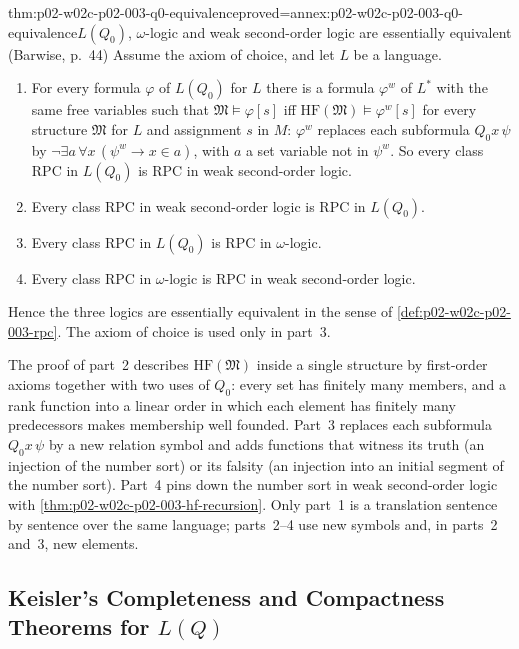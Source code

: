 \begin{hbtheorem}{thm:p02-w02c-p02-003-q0-equivalence}{proved=annex:p02-w02c-p02-003-q0-equivalence}{\(L(Q_0)\), \(\omega\)-logic and weak second-order logic are essentially equivalent (Barwise, p.~44)}
Assume the axiom of choice, and let \(L\) be a language.
\begin{enumerate}
\item For every formula \(\varphi\) of \(L(Q_0)\) for \(L\) there is a
      formula \(\varphi^{w}\) of \(L^{*}\) with the same free variables such
      that \(\mathfrak M\models\varphi[s]\) iff
      \(\mathrm{HF}(\mathfrak M)\models\varphi^{w}[s]\) for every structure
      \(\mathfrak M\) for \(L\) and assignment \(s\) in \(M\): \(\varphi^{w}\)
      replaces each subformula \(Q_0x\,\psi\) by
      \(\neg\exists a\,\forall x\,(\psi^{w}\to x\in a)\), with \(a\) a set
      variable not in \(\psi^{w}\).  So every class RPC in \(L(Q_0)\) is RPC
      in weak second-order logic.
\item Every class RPC in weak second-order logic is RPC in \(L(Q_0)\).
\item Every class RPC in \(L(Q_0)\) is RPC in \(\omega\)-logic.
\item Every class RPC in \(\omega\)-logic is RPC in weak second-order
      logic.
\end{enumerate}
Hence the three logics are essentially equivalent in the sense of
\cref{def:p02-w02c-p02-003-rpc}.  The axiom of choice is used only in
part~3.
\end{hbtheorem}

The proof of part~2 describes \(\mathrm{HF}(\mathfrak M)\) inside a single
structure by first-order axioms together with two uses of \(Q_0\): every
set has finitely many members, and a rank function into a linear order in
which each element has finitely many predecessors makes membership
well founded.  Part~3 replaces each subformula \(Q_0x\,\psi\) by a new
relation symbol and adds functions that witness its truth (an injection of
the number sort) or its falsity (an injection into an initial segment of
the number sort).  Part~4 pins down the number sort in weak second-order
logic with \cref{thm:p02-w02c-p02-003-hf-recursion}.  Only part~1 is a
translation sentence by sentence over the same language; parts~2--4 use
new symbols and, in parts~2 and~3, new elements.

\subsection{Keisler's Completeness and Compactness Theorems for \(L(Q)\)}
\label{sec:p02-w02c-p02-003-keisler}

